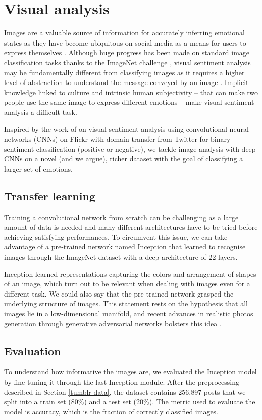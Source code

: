 \documentclass{article} %
\begin{document}
\section{Visual analysis}
Images are a valuable source of information for accurately inferring emotional states as they have become ubiquitous on social media as a means for users to express themselves \citep{miller2017visualising}. Although huge progress has been made on standard image classification tasks thanks to the ImageNet challenge \citep{Imagenet-15}, visual sentiment analysis may be fundamentally different from classifying images as it requires a higher level of abstraction to understand the message conveyed by an image \citep{Joshi-11}. Implicit knowledge linked to culture and intrinsic human subjectivity -- that can make two people use the same image to express different emotions -- make visual sentiment analysis a difficult task.

Inspired by the work of \citet{You-15} on visual sentiment analysis using convolutional neural networks (CNNs) on Flickr with domain transfer from Twitter for binary sentiment classification (positive or negative), we tackle image analysis with deep CNNs on a novel (and we argue), richer dataset with the goal of classifying a larger set of emotions.

\subsection{Transfer learning}
Training a convolutional network from scratch can be challenging as a large amount of data is needed and many different architectures have to be tried before achieving satisfying performances. To circumvent this issue, we can take advantage of a pre-trained network named Inception \citep{Szegedy-15} that learned to recognise images through the ImageNet dataset with a deep architecture of 22 layers.

Inception learned representations capturing the colors and arrangement of shapes of an image, which turn out to be relevant when dealing with images even for a different task. We could also say that the pre-trained network grasped the underlying structure of images. This statement rests on the hypothesis that all images lie in a low-dimensional manifold, and recent advances in realistic photos generation through generative adversarial networks bolsters this idea \citep{Radford-16}. 

\subsection{Evaluation}
\label{section:image-evaluation}
To understand how informative the images are, we evaluated the Inception model by fine-tuning it through the last Inception module. After the preprocessing described in Section \ref{tumblr-data}, the dataset contains 256,897 posts that we split into a train set (80\%) and a test set (20\%). The metric used to evaluate the model is accuracy, which is the fraction of correctly classified images.
\end{document}
